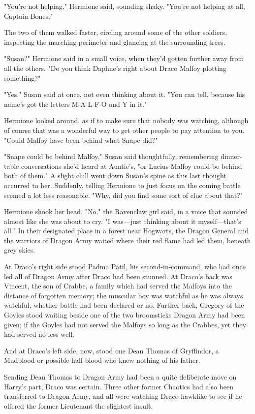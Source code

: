 "You're not helping," Hermione said, sounding shaky. "You're not helping at
all, Captain Bones."

The two of them walked faster, circling around some of the other soldiers,
inspecting the marching perimeter and glancing at the surrounding trees.

"Susan?" Hermione said in a small voice, when they'd gotten further away from
all the others. "Do you think Daphne's right about Draco Malfoy plotting
something?"

"Yes," Susan said at once, not even thinking about it. "You can tell, because
his name's got the letters M-A-L-F-O and Y in it."

Hermione looked around, as if to make sure that nobody was watching, although
of course that was a wonderful way to get other people to pay attention to you.
"Could Malfoy have been behind what Snape did?"

"Snape could be behind Malfoy," Susan said thoughtfully, remembering
dinner-table conversations she'd heard at Auntie's, "or Lucius Malfoy could be
behind both of them." A slight chill went down Susan's spine as this last
thought occurred to her. Suddenly, telling Hermione to just focus on the coming
battle seemed a lot less reasonable. "Why, did you find some sort of clue about
that?"

Hermione shook her head. "No," the Ravenclaw girl said, in a voice that sounded
almost like she was about to cry. "I was—just thinking about it
myself—that's all."
\sbreak
In their designated place in a forest near Hogwarts, the Dragon General and the
warriors of Dragon Army waited where their red flame had led them, beneath grey
skies.

At Draco's right side stood Padma Patil, his second-in-command, who had once
led all of Dragon Army after Draco had been stunned. At Draco's back was
Vincent, the son of Crabbe, a family which had served the Malfoys into the
distance of forgotten memory; the muscular boy was watchful as he was always
watchful, whether battle had been declared or no. Further back, Gregory of the
Goyles stood waiting beside one of the two broomsticks Dragon Army had been
given; if the Goyles had not served the Malfoys so long as the Crabbes, yet
they had served no less well.

And at Draco's left side, now, stood one Dean Thomas of Gryffindor, a Mudblood
or possible half-blood who knew nothing of his father.

Sending Dean Thomas to Dragon Army had been a quite deliberate move on Harry's
part, Draco was certain. Three other former Chaotics had also been transferred
to Dragon Army, and all were watching Draco hawklike to see if he offered the
former Lieutenant the slightest insult.

